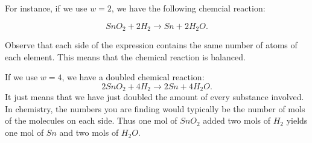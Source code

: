 \documentclass{ximera}
\begin{document}
\begin{solution}
For instance, if we use $w=2$, we have the following chemcial reaction: 

\begin{equation*}
  SnO_2+2H_2\rightarrow Sn+2H_2O.
\end{equation*}

Observe that each side of the expression contains the same number of
atoms of each element. This means that the chemical reaction is
balanced. 

If we use $w=4$, we have a doubled chemical reaction:
\begin{equation*}
  2SnO_2+4H_2\rightarrow 2Sn+4H_2O.
\end{equation*}
It just means that we have just doubled the amount of
every substance involved. In chemistry, the numbers you are finding
would typically be the number of mols of the molecules on each
side. Thus one mol of $SnO_2$ added two mols of $H_2$ yields one mol
of $Sn$ and two mols of $H_2O$.

\end{solution}
\end{document}
